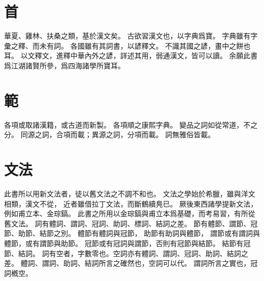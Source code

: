 \section{首}
華夏、雞林、扶桑之類，基於漢文矣。
古欲習漢文也，以字典爲寶。
字典雖有字彙之釋、而未有詞。
各國雖有其詞書，以諺釋文。
不識其國之諺，畫中之餅也耳。
以文釋文，進釋中華內外之諺，詳述其用，弱通漢文，皆可以讀。
余願此書爲江湖諸賢所參，爲四海諸學所寶耳。
\section{範}
各項或取諸漢籍，或古道而新製。
各項順之康熙字典。
變品之詞如從常道，不之分。
同源之詞，合項而載；異源之詞，分項而載。
詞無雅俗皆載。
\section{文法}
此書所以用新文法者，徒以舊文法之不調不和也。
文法之學始於希臘，雖與洋文相類，漢文不從，
近者雖借拉丁文法，而斷鶴續鳧已。
厥後東西諸學提新文法，例如甫立本、金琮鎬。
此書之所用以金琮鎬與甫立本爲基礎，而考易習，有所從舊文法。
詞有體詞、謂詞、冠詞、助詞、標詞、結詞之差。
節有體節、謂節、冠節、助節、結節之別。
體節有體詞與冠節，
助節有助詞與體節，
謂節或有謂詞與體節，或有謂節與助節。
冠節或有冠詞與謂節，否則有冠節與結節。
結節有冠節、結詞。
詞有空者，字數零也。空詞亦有體詞、謂詞、冠詞、助詞、結詞之差。
體詞、謂詞、助詞、結詞所言之確然也，空詞可以代。
謂詞所言之實也，冠詞槪空。
